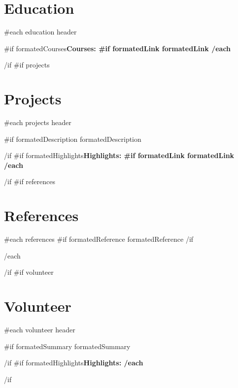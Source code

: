 \documentclass{article}
\begin{document}
\begin{paracol}{2}
\begin{rightcolumn}
\section*{Education} {
  {{#each education}}
    {{ header }}\par
    {{#if formatedCourses}}\bfseries Courses: 
    {{#if formatedLink}}{{ formatedLink }}
  {{/each}}
}
{{/if}}
{{#if projects}}
\section*{Projects} {
  {{#each projects}}
    {{ header }}\par
    {{#if formatedDescription}}
      {{ formatedDescription }}
      \par
    {{/if}}
    {{#if formatedHighlights}}\bfseries Highlights: 
    {{#if formatedLink}}{{ formatedLink }}
  {{/each}}
}
{{/if}}
{{#if references}}
\section*{References} {
  {{#each references}}
    {{#if formatedReference}}{{ formatedReference }}{{/if}}
    \par
  {{/each}}
}
{{/if}}
{{#if volunteer}}
\section*{Volunteer} {
  {{#each volunteer}}
    {{ header }}\par
    {{#if formatedSummary}}
      {{ formatedSummary }}
      \par
    {{/if}}
    {{#if formatedHighlights}}\bfseries Highlights: 
  {{/each}}
}
{{/if}}

\end{rightcolumn}
\end{paracol}
\end{document}
